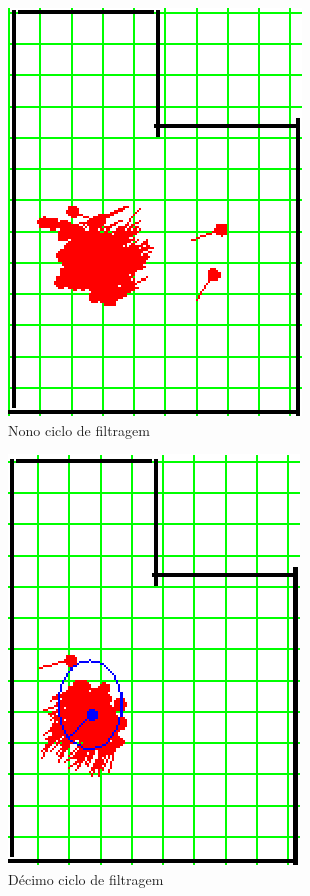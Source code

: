 \begin{figure}[H]
  \centering
  \includegraphics[scale=1]{figuras/cen1_ex2/10.eps}
  \caption[Nono Ciclo de Filtragem]{Nono ciclo de filtragem}
  \label{img:cen1_ex2_10}
\end{figure}

\begin{figure}[H]
  \centering
  \includegraphics[scale=1]{figuras/cen1_ex2/11.eps}
  \caption[Décimo Ciclo de Filtragem]{Décimo ciclo de filtragem}
  \label{img:cen1_ex2_11}
\end{figure}

